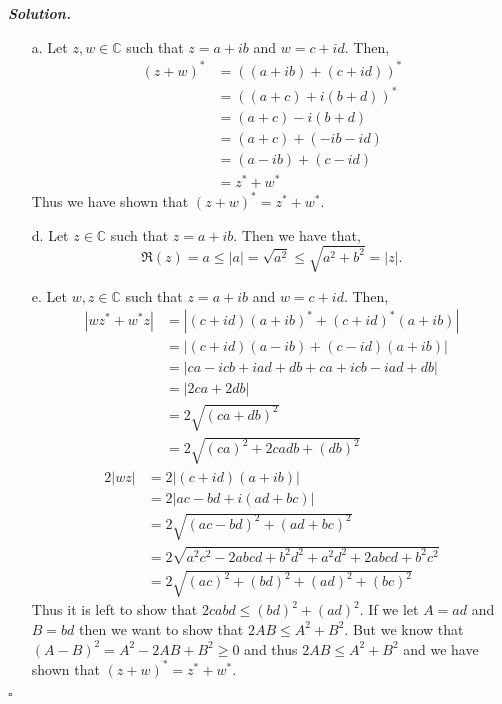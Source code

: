 \documentclass[12pt]{report}
\newenvironment{solution}[1][\it{Solution}]{\textbf{#1. } }{$\square$}
\def\C{{\mathbb C}}
\begin{document}
\begin{solution}
    \noindent
    \begin{enumerate}
        \item [a.] 
        Let $z,w \in \C$ such that $z=a+ib$ and $w=c+id$.
        Then,
        \begin{align*}
            (z+w)^* &= ((a+ib) + (c+id))^*\\
                    &= ((a+c) + i(b+d))^*\\
                    &= (a+c) - i(b+d)\\
                    &= (a+c) +(-ib - id)\\
                    &= (a-ib) + (c - id)\\
                    &= z^* + w^*
        \end{align*}
        Thus we have shown that $(z+w)^* = z^* + w^*$.
        \item [d.]
        Let $z \in \C$ such that $z=a+ib$.
        Then we have that,
        $$\Re(z) = a \leq |a| = \sqrt{a^2} \leq \sqrt{a^2 + b^2} = |z|.$$
        \item [e.]
        Let $w,z \in \C$ such that $z=a+ib$ and $w=c+id$.
        Then,
        \begin{align*}
            |wz^* + w^*z| &= |(c+id)(a+ib)^* + (c+id)^*(a+ib)|\\
                          &= |(c+id)(a-ib) + (c-id)(a+ib)|\\
                          &= |ca - icb + iad + db + ca + icb -iad + db|\\
                          &= |2ca +2db|\\
                          &= 2\sqrt{(ca + db)^2}\\
                          &= 2\sqrt{(ca)^2 + 2cadb + (db)^2}
        \end{align*}
        \begin{align*}
            2|wz| &= 2 |(c+id)(a+ib)|\\
                  &= 2 |a c - b d + i (a d + b c) |\\
                  &= 2 \sqrt{(ac - bd)^2 + (ad + bc)^2}\\
                  &= 2 \sqrt{ a^2 c^2 - 2 a b c d + b^2 d^2 + a^2 d^2 + 2 a b c d + b^2 c^2}\\
                  &= 2 \sqrt{ (ac)^2 + (bd)^2 + (ad)^2 + (bc)^2}\
        \end{align*}
        Thus it is left to show that $2cabd \leq (bd)^2 + (ad)^2$.
        If we let $A = ad$ and $B = bd$ then we want to show that $2AB \leq A^2 + B^2$. But we know that $(A-B)^2 = A^2 - 2AB + B^2 \geq 0$
        and thus $2AB \leq A^2 + B^2$ and we have shown that $(z+w)^* = z^* + w^*$. 


\end{enumerate}
\end{solution}
\end{document}

